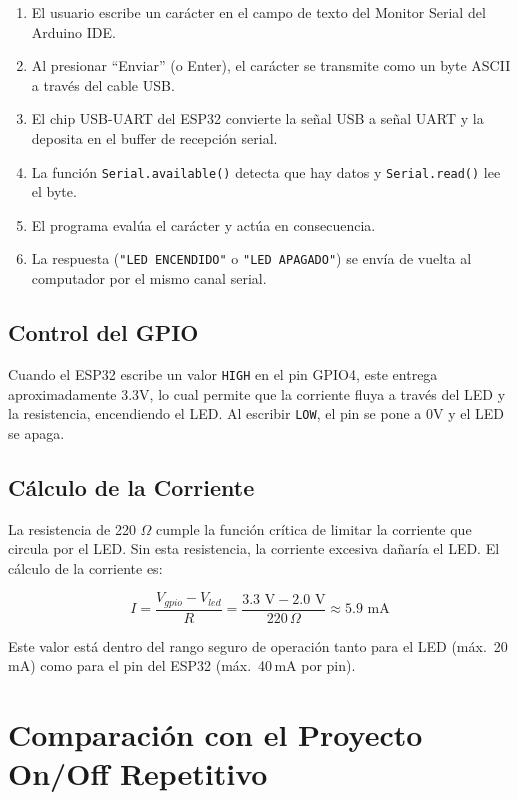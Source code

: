 \documentclass[12pt,a4paper]{article}
\begin{document}
\begin{enumerate}
    \item El usuario escribe un carácter en el campo de texto del Monitor Serial del Arduino IDE.
    \item Al presionar ``Enviar'' (o Enter), el carácter se transmite como un byte ASCII a través del cable USB.
    \item El chip USB-UART del ESP32 convierte la señal USB a señal UART y la deposita en el buffer de recepción serial.
    \item La función \texttt{Serial.available()} detecta que hay datos y \texttt{Serial.read()} lee el byte.
    \item El programa evalúa el carácter y actúa en consecuencia.
    \item La respuesta (\texttt{"LED ENCENDIDO"} o \texttt{"LED APAGADO"}) se envía de vuelta al computador por el mismo canal serial.
\end{enumerate}

\subsection{Control del GPIO}
Cuando el ESP32 escribe un valor \texttt{HIGH} en el pin GPIO4, este entrega aproximadamente 3.3V, lo cual permite que la corriente fluya a través del LED y la resistencia, encendiendo el LED. Al escribir \texttt{LOW}, el pin se pone a 0V y el LED se apaga.

\subsection{Cálculo de la Corriente}
La resistencia de 220 $\Omega$ cumple la función crítica de limitar la corriente que circula por el LED. Sin esta resistencia, la corriente excesiva dañaría el LED. El cálculo de la corriente es:

\begin{equation}
I = \frac{V_{gpio} - V_{led}}{R} = \frac{3.3\text{ V} - 2.0\text{ V}}{220\,\Omega} \approx 5.9\text{ mA}
\label{eq:corriente}
\end{equation}

Este valor está dentro del rango seguro de operación tanto para el LED (máx.\ 20\,mA) como para el pin del ESP32 (máx.\ 40\,mA por pin).

\section{Comparación con el Proyecto On/Off Repetitivo}
\end{document}
